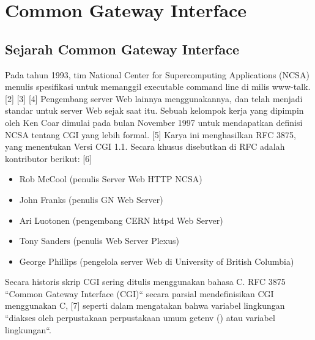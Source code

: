 \section{Common Gateway Interface}
\subsection{Sejarah Common Gateway Interface}
Pada tahun 1993, tim National Center for Supercomputing Applications (NCSA) menulis spesifikasi untuk memanggil executable command line di milis www-talk. [2] [3] [4] Pengembang server Web lainnya menggunakannya, dan telah menjadi standar untuk server Web sejak saat itu. Sebuah kelompok kerja yang dipimpin oleh Ken Coar dimulai pada bulan November 1997 untuk mendapatkan definisi NCSA tentang CGI yang lebih formal. [5] Karya ini menghasilkan RFC 3875, yang menentukan Versi CGI 1.1. Secara khusus disebutkan di RFC adalah kontributor berikut: [6]
\begin{itemize}
\item Rob McCool (penulis Server Web HTTP NCSA)
\item John Franks (penulis GN Web Server)
\item Ari Luotonen (pengembang CERN httpd Web Server)
\item Tony Sanders (penulis Web Server Plexus)
\item George Phillips (pengelola server Web di University of British Columbia)
\end{itemize}
Secara historis skrip CGI sering ditulis menggunakan bahasa C. RFC 3875 ``Common Gateway Interface (CGI)`` secara parsial mendefinisikan CGI menggunakan C, [7] seperti dalam mengatakan bahwa variabel lingkungan ``diakses oleh perpustakaan perpustakaan umum getenv () atau variabel lingkungan``.  \cite{mccool1993common}
